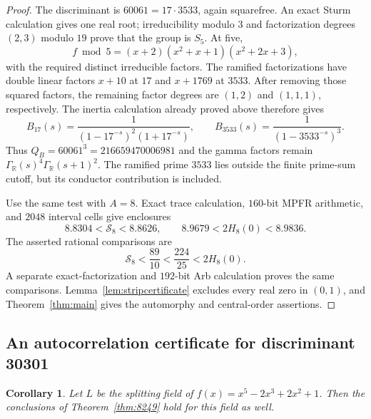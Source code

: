 \documentclass[11pt]{article}
\newtheorem{corollary}[theorem]{Corollary}
\theoremstyle{definition}
\theoremstyle{remark}
\newcommand{\R}{\mathbb R}
\newcommand{\Gr}{\Gamma_{\R}}
\numberwithin{equation}{section}
\begin{document}
\begin{proof}
The discriminant is $60061=17\cdot3533$, again squarefree. An exact Sturm calculation gives one real root; irreducibility modulo $3$ and factorization degrees $(2,3)$ modulo $19$ prove that the group is $S_5$. At five,
\[
f\bmod5=(x+2)(x^2+x+1)(x^2+2x+3),
\]
with the required distinct irreducible factors. The ramified factorizations have double linear factors $x+10$ at $17$ and $x+1769$ at $3533$. After removing those squared factors, the remaining factor degrees are $(1,2)$ and $(1,1,1)$, respectively. The inertia calculation already proved above therefore gives
\[
B_{17}(s)=\frac1{(1-17^{-s})^2(1+17^{-s})},\qquad
B_{3533}(s)=\frac1{(1-3533^{-s})^3}.
\]
Thus $Q_B=60061^3=216659470006981$ and the gamma factors remain $\Gr(s)^4\Gr(s+1)^2$. The ramified prime $3533$ lies outside the finite prime-sum cutoff, but its conductor contribution is included.

Use the same test with $A=8$. Exact trace calculation, $160$-bit MPFR arithmetic, and $2048$ interval cells give enclosures
\[
8.8304<\mathcal S_8<8.8626,\qquad
8.9679<2H_8(0)<8.9836.
\]
The asserted rational comparisons are
\[
\mathcal S_8<\frac{89}{10}<\frac{224}{25}<2H_8(0).
\]
A separate exact-factorization and $192$-bit Arb calculation proves the same comparisons. Lemma~\ref{lem:stripcertificate} excludes every real zero in $(0,1)$, and Theorem~\ref{thm:main} gives the automorphy and central-order assertions.
\end{proof}

\subsection{An autocorrelation certificate for discriminant 30301}

\begin{corollary}\label{cor:30301}
Let $L$ be the splitting field of $f(x)=x^5-2x^3+2x^2+1$. Then the conclusions of Theorem~\ref{thm:8249} hold for this field as well.
\end{corollary}
\end{document}
